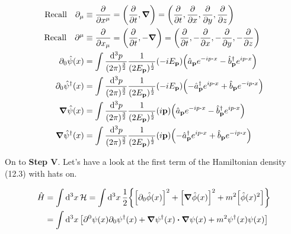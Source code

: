 \documentclass{article}
\begin{document}
\begin{align*}
    \qq*{Recall}\partial_\mu          & \equiv\pdv{x^\mu}=\pqty{\pdv{t},\grad}=\pqty{\pdv{t},\pdv{x},\pdv{y},\pdv{z}}                                                                                                 \\
    \qq*{Recall}\partial^\mu          & \equiv\pdv{x_\mu}=\pqty{\pdv{t},-\grad}=\pqty{\pdv{t},-\pdv{x},-\pdv{y},-\pdv{z}}                                                                                             \\
    \partial_0 \hat{\psi}(x)          & =\int \frac{\dd[3]{p}}{(2\pi)^\frac{3}{2}}  \frac{1}{(2E_{\vb{p}})^{\frac{1}{2}}} (-iE_{\vb{p}}) \pqty{\hat{a}_{\vb{p}}e^{-ip\vdot x}-\hat{b}^\dagger_{\vb{p}}e^{ip\vdot x}}  \\
    \partial_0 \hat{\psi}^\dagger (x) & =\int \frac{\dd[3]{p}}{(2\pi)^\frac{3}{2}}  \frac{1}{(2E_{\vb{p}})^{\frac{1}{2}}} (-iE_{\vb{p}}) \pqty{-\hat{a}^\dagger_{\vb{p}}e^{ip\vdot x}+\hat{b}_{\vb{p}}e^{-ip\vdot x}} \\
    \grad{\hat{\psi}(x)}              & =\int \frac{\dd[3]{p}}{(2\pi)^\frac{3}{2}}  \frac{1}{(2E_{\vb{p}})^{\frac{1}{2}}} (i\vb{p}) \pqty{\hat{a}_{\vb{p}}e^{-ip\vdot x}-\hat{b}^\dagger_{\vb{p}}e^{ip\vdot x}}       \\
    \grad{\hat{\psi}^\dagger (x)}     & =\int \frac{\dd[3]{p}}{(2\pi)^\frac{3}{2}}  \frac{1}{(2E_{\vb{p}})^{\frac{1}{2}}} (i\vb{p}) \pqty{-\hat{a}^\dagger_{\vb{p}}e^{ip\vdot x}+\hat{b}_{\vb{p}}e^{-ip\vdot x}}      \\
\end{align*}

On to \textbf{Step V}. Let's have a look at the first term of the Hamiltonian density (12.3) with hats on.

\begin{align*}
    \hat{H} & =\int\dd[3]{x}\mathcal{H}=\int\dd[3]{x}\frac{1}{2}\Bqty{\bqty{\partial_0\hat{\phi}(x)}^2+\bqty{\grad\hat{\phi}(x)}^2+m^2\bqty{\hat{\phi}(x)^2}} \\
            & =\int\dd[3]{x}\bqty{\partial^0\psi(x)\partial_0\psi^\dagger(x)+\grad\psi^\dagger(x)\vdot\grad\psi(x)+m^2\psi^\dagger(x)\psi(x)}
\end{align*}
\end{document}
